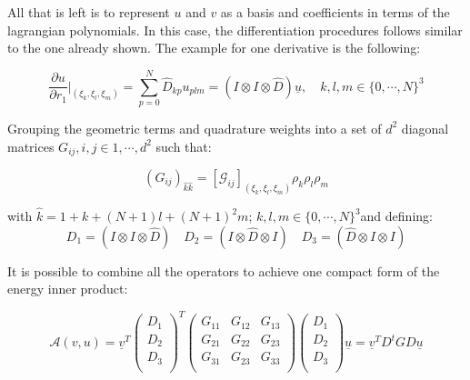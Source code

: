 \documentclass[
  a4paper,
  10pt]{article}
\begin{document}
All that is left is to represent \(u\) and \(v\) as a basis and
coefficients in terms of the lagrangian polynomials. In this case, the
differentiation procedures follows similar to the one already shown. The
example for one derivative is the following:

\begin{equation}
    \frac{\partial u}{\partial r_1}\rvert_{(\xi_k,\xi_l,\xi_m)}=\sum_{p=0}^{N} \hat{D}_{kp}u_{plm}= (I \otimes I \otimes \hat{D})\underline{u}, \quad k,l,m \in \{0, \cdots, N\}^{3}
\end{equation}

Grouping the geometric terms and quadrature weights into a set of
\(d^2\) diagonal matrices \(G_{ij}, i,j \in {1,\cdots, d^2}\) such that:

\begin{equation}
    (G_{ij})_{\hat{k}\hat{k}}=\left[ \mathcal{G}_{ij}  \right]_{(\xi_k,\xi_l,\xi_m)} \rho_k \rho_l \rho_m
\end{equation}

with \(\hat{k}=1+k+(N+1)l+(N+1)^{2}m\);
\(k,l,m \in \{0, \cdots, N \}^{3}\)and defining: \begin{equation}
    D_1=(I \otimes I \otimes \hat{D}) \quad D_2=(I \otimes \hat{D} \otimes I) \quad D_3=(\hat{D} \otimes I \otimes I)
\end{equation}

It is possible to combine all the operators to achieve one compact form
of the energy inner product:

\begin{equation}
    \mathcal{A}(v,u)= \underline{v}^{T}
    \begin{pmatrix}
    D_1 \\
    D_2 \\
    D_3 \\
    \end{pmatrix}^{T} 
    \begin{pmatrix}
    G_{11} & G_{12} & G_{13}\\
    G_{21} & G_{22} & G_{23}\\
    G_{31} & G_{23} & G_{33}\\
    \end{pmatrix} 
    \begin{pmatrix}
    D_1 \\
    D_2 \\
    D_3 \\
    \end{pmatrix} \underline{u}=\underline{v}^{T}D^{t}GD\underline{u}
\end{equation}
\end{document}
